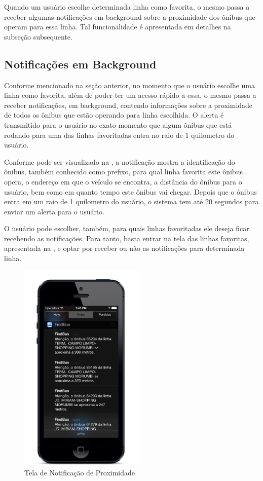 Quando um usuário escolhe determinada linha como favorita, o mesmo passa a receber algumas notificações em background sobre a proximidade dos ônibus que operam para essa linha. Tal funcionalidade é apresentada em detalhes na subseção subsequente. 

\subsection{Notificações em Background}

Conforme mencionado na seção anterior, no momento que o usuário escolhe uma linha como favorita, além de poder ter um acesso rápido a essa, o mesmo passa a receber notificações, em background, contendo informações sobre a proximidade de todos os ônibus que estão operando para linha escolhida. O alerta é transmitido para o usuário no exato momento que algum ônibus que está rodando para uma das linhas favoritadas entra no raio de 1 quilometro do usuário. 

Conforme pode ser visualizado na , a notificação mostra a identificação do ônibus, também conhecido como prefixo, para qual linha favorita este ônibus opera, o endereço em que o veículo se encontra, a distância do ônibus para o usuário, bem como em quanto tempo este ônibus vai chegar. Depois que o ônibus entra em um raio de 1 quilometro do usuário, o sistema tem até 20 segundos para  enviar um alerta para o usuário.
	
O usuário pode escolher, também, para quais linhas favoritadas ele deseja ficar recebendo as notificações. Para tanto, basta entrar na tela das linhas favoritas, apresentada na , e optar por receber ou não as notificações para determinada linha.

\begin{figure}[htp]
\begin{center}
  \includegraphics[width=6cm]{images/telas/notificacao.png}
  \caption{Tela de Notificação de Proximidade}
  \label{fig:telaNotificacao}
\end{center}
\end{figure}

